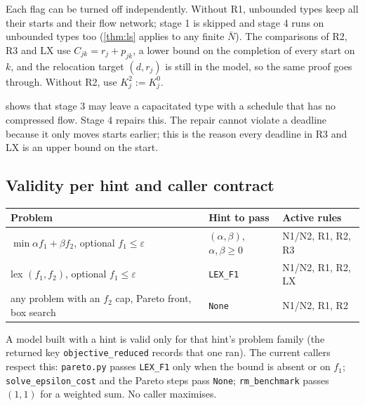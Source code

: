 \documentclass[11pt,a4paper]{article}
\newcommand{\code}[1]{\texttt{#1}}
\begin{document}
\begin{remark}
Each flag can be turned off independently. Without R1, unbounded types keep
all their starts and their flow network; stage 1 is skipped and stage 4 runs
on unbounded types too (\cref{thm:ls} applies to any finite $\bar N$). The
comparisons of R2, R3 and LX use $C_{jk}=r_j+p_{jk}$, a lower bound on the
completion of every start on $k$, and the relocation target $(d,r_j)$ is
still in the model, so the same proof goes through. Without R2, use
$K^2_j:=K^0_j$.
\end{remark}

\begin{remark}
 shows that stage 3 may leave a capacitated type with a
schedule that has no compressed flow. Stage 4 repairs this. The repair cannot
violate a deadline because it only moves starts earlier; this is the reason
every deadline in R3 and LX is an upper bound on the start.
\end{remark}

\subsection{Validity per hint and caller contract}

\begin{center}
\begin{tabular}{@{}lll@{}}
\toprule
Problem & Hint to pass & Active rules\\
\midrule
$\min\alpha f_1+\beta f_2$, optional $f_1\le\varepsilon$ & $(\alpha,\beta)$, $\alpha,\beta\ge0$ & N1/N2, R1, R2, R3\\
lex $(f_1,f_2)$, optional $f_1\le\varepsilon$ & \code{LEX\_F1} & N1/N2, R1, R2, LX\\
any problem with an $f_2$ cap, Pareto front, box search & \code{None} & N1/N2, R1, R2\\
\bottomrule
\end{tabular}
\end{center}

A model built with a hint is valid only for that hint's problem family
(the returned key \code{objective\_reduced} records that one ran). The current callers
respect this: \code{pareto.py} passes \code{LEX\_F1} only when the bound is
absent or on $f_1$; \code{solve\_epsilon\_cost} and the Pareto steps pass
\code{None}; \code{rm\_benchmark} passes $(1,1)$ for a weighted sum. No caller
maximises.

\end{document}

